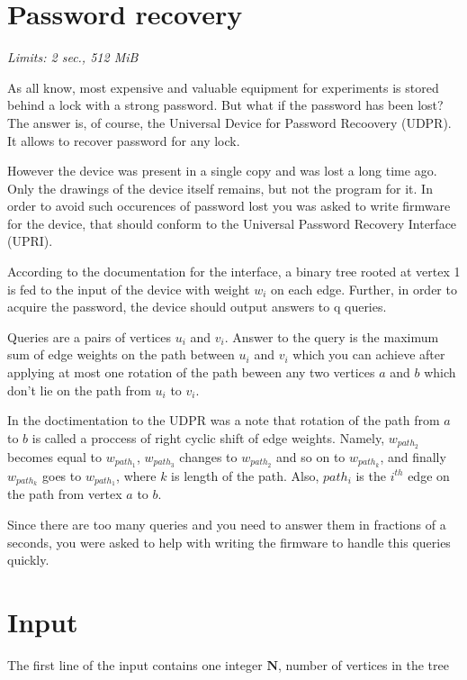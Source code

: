 \documentclass [11pt, a4paper, oneside, notitlepage] {article}
\begin{document}
\section*{Password recovery}
\hspace{1cm}
\emph{Limits: 2 sec., 512 MiB}
\bigskip

As all know, most expensive and valuable equipment for experiments is stored behind a lock with a strong password. 
But what if the password has been lost? The answer is, of course, the Universal Device for Password Recoovery (UDPR). It allows to recover password for any lock.

However the device was present in a single copy and was lost a long time ago. Only the drawings of the device itself remains, but not the program for it. 
In order to avoid such occurences of password lost you was asked to write firmware for the device, that should conform to the Universal Password Recovery Interface (UPRI).

According to the documentation for the interface, a binary tree rooted at vertex 1 is fed to the input of the device with weight $w_i$ on each edge.
Further, in order to acquire the password, the device should output answers to q queries.

Queries are a pairs of vertices $u_i$ and $v_i$. 
Answer to the query is the maximum sum of edge weights on the path between $u_i$ and $v_i$ which you can achieve after applying at most one rotation of the path beween any two vertices $a$ and $b$ which don't lie on the path from $u_i$ to $v_i$.

In the doctimentation to the UDPR was a note that rotation of the path from $a$ to $b$ is called a proccess of right cyclic shift of edge weights. Namely, $w_{path_2}$ becomes equal to $w_{path_1}$, $w_{path_3}$ changes to $w_{path_2}$ and so on to $w_{path_k}$, and finally $w_{path_k}$ goes to $w_{path_1}$, where $k$ is length of the path. Also, $path_i$ is the $i^{th}$ edge on the path from vertex $a$ to $b$.

Since there are too many queries and you need to answer them in fractions of a seconds, you were asked to help with writing the firmware to handle this queries quickly.

\section*{Input}

The first line of the input contains one integer $\mathbf{N}$, number of vertices in the tree
\end{document}
